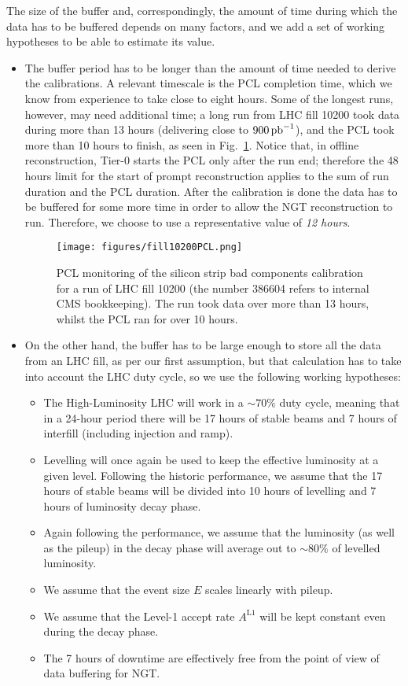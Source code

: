 The size of the buffer and, correspondingly, the amount of time during which the data has to be buffered depends on many factors, and we add a set of working hypotheses to be able to estimate its value.
\begin{itemize}
\item The buffer period has to be longer than the amount of time needed to derive the calibrations.
A relevant timescale is the PCL completion time, which we know from experience to take close to eight hours.
Some of the longest runs, however, may need additional time; a long run from LHC fill 10200 took data during more than 13 hours
(delivering close to $900\mbox{\ensuremath{\,\text{pb}^{-1}}}$), and
the PCL took more than 10 hours to finish,
as seen in Fig.~\ref{fig:fill10200PCL}.
Notice that, in offline reconstruction, Tier-0 starts the PCL only after the run end; 
therefore the 48 hours limit for the start of prompt reconstruction applies to 
the sum of run duration and the PCL duration.
After the calibration is done the data has to be buffered for some more time in order to allow the NGT reconstruction to run.
Therefore, we choose to use a representative value of \emph{12 hours}.
\begin{figure}[htbp]
   \centering
	\texttt{[image: figures/fill10200PCL.png]}
   \caption{PCL monitoring of the silicon strip bad components calibration for a run of LHC fill 10200 (the number 386604 refers to internal CMS bookkeeping).
   The run took data over more than 13 hours, whilst the PCL ran for over 10 hours.}
   \label{fig:fill10200PCL}
\end{figure}
\item On the other hand, the buffer has to be large enough to store all the data from an LHC fill, as per our first assumption,
but that calculation has to take into account the LHC duty cycle, so we use the following working hypotheses:
\begin{itemize}
\item The High-Luminosity LHC will work in a $\sim70\%$ duty cycle, meaning that in a 24-hour period there will be 17 hours of stable beams and 7 hours of interfill (including injection and ramp).
\item Levelling will once again be used to keep the effective luminosity at a given level.
Following the \Runthree historic performance, we assume that the 17 hours of stable beams will be divided into 10 hours of levelling and 7 hours of luminosity decay phase.
\item Again following the \Runthree performance, we assume that the luminosity (as well as the pileup) in the decay phase will average out to $\sim80\%$ of levelled luminosity.
\item We assume that the event size $E$ scales linearly with pileup.
\item We assume that the Level-1 accept rate $A^{\text{L1}}$ will be kept constant even during the decay phase. 
\item The 7 hours of downtime are effectively free from the point of view of data buffering for NGT.
\end{itemize}
\end{itemize}

